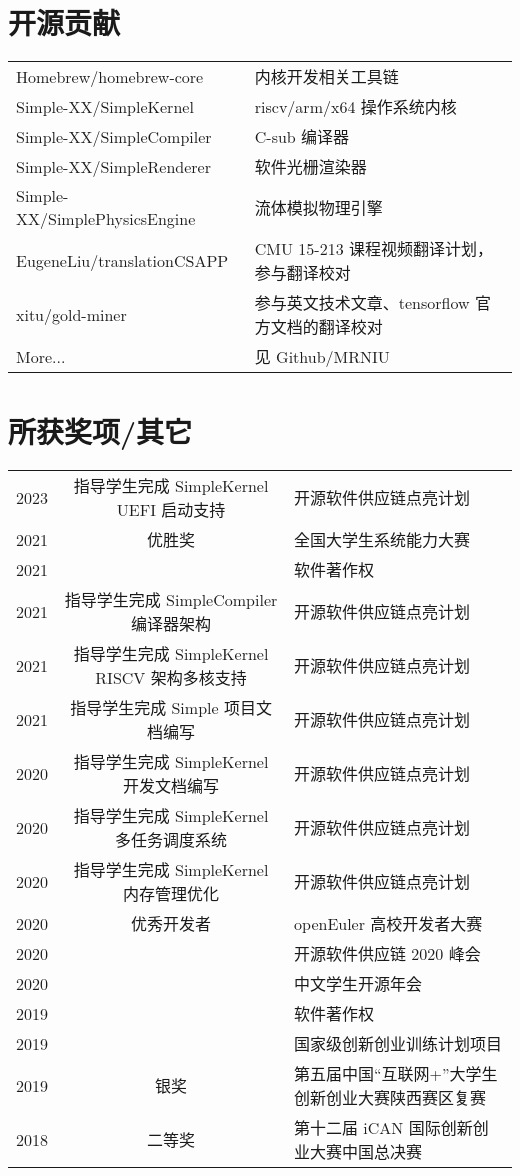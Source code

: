 \documentclass{resume}
\begin{document}
\section{开源贡献}
\begin{tabular}{ll}
  Homebrew/homebrew-core & 内核开发相关工具链 \\
  Simple-XX/SimpleKernel & riscv/arm/x64 操作系统内核 \\
  Simple-XX/SimpleCompiler & C-sub 编译器 \\
  Simple-XX/SimpleRenderer & 软件光栅渲染器 \\
  Simple-XX/SimplePhysicsEngine & 流体模拟物理引擎 \\
  EugeneLiu/translationCSAPP & CMU 15-213 课程视频翻译计划，参与翻译校对 \\
  xitu/gold-miner & 参与英文技术文章、tensorflow 官方文档的翻译校对 \\
  More... & 见 Github/MRNIU
\end{tabular}
\sectionsep

\section{所获奖项/其它} 
\begin{tabular}{rcl}
    2023         & 指导学生完成 SimpleKernel UEFI 启动支持 & 开源软件供应链点亮计划 \\
    2021         & 优胜奖 & 全国大学生系统能力大赛 \\ 
    2021         & & 软件著作权 \\
    2021         & 指导学生完成 SimpleCompiler 编译器架构 & 开源软件供应链点亮计划 \\
    2021         & 指导学生完成 SimpleKernel RISCV 架构多核支持 & 开源软件供应链点亮计划 \\
    2021         & 指导学生完成 Simple 项目文档编写 & 开源软件供应链点亮计划 \\
    2020         & 指导学生完成 SimpleKernel 开发文档编写 & 开源软件供应链点亮计划 \\
    2020         & 指导学生完成 SimpleKernel 多任务调度系统 & 开源软件供应链点亮计划 \\
    2020         & 指导学生完成 SimpleKernel 内存管理优化 & 开源软件供应链点亮计划 \\
    2020         & 优秀开发者 & openEuler 高校开发者大赛 \\ 
    2020         & & 开源软件供应链 2020 峰会 \\
    2020         & & 中文学生开源年会 \\
    2019         & & 软件著作权 \\
    2019         & & 国家级创新创业训练计划项目 \\
    2019         & 银奖    & 第五届中国“互联网+”大学生创新创业大赛陕西赛区复赛 \\
    2018	       & 二等奖  & 第十二届 iCAN 国际创新创业大赛中国总决赛 \\
\end{tabular}
\sectionsep
\end{document}
